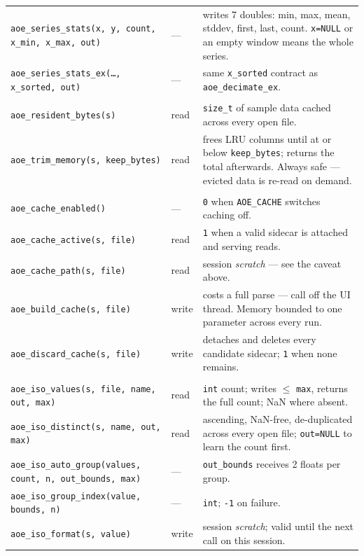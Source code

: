 \documentclass[11pt,a4paper,oneside]{report}
\newcommand{\code}[1]{\texttt{#1}}
\begin{document}
\begin{longtable}{@{}p{}p{}p{}@{}}
\code{aoe\_series\_stats(x, y, count, x\_min, x\_max, out)} & --- & writes 7 doubles: min, max, mean, stddev, first, last, count. \code{x=NULL} or an empty window means the whole series. \\
\code{aoe\_series\_stats\_ex(\ldots, x\_sorted, out)} & --- & same \code{x\_sorted} contract as \code{aoe\_decimate\_ex}. \\
\addlinespace
\multicolumn{3}{@{}l@{}}{\textit{Memory}} \\
\code{aoe\_resident\_bytes(s)} & read & \code{size\_t} of sample data cached across every open file. \\
\code{aoe\_trim\_memory(s, keep\_bytes)} & read & frees LRU columns until at or below \code{keep\_bytes}; returns the total afterwards. Always safe --- evicted data is re-read on demand. \\
\addlinespace
\multicolumn{3}{@{}l@{}}{\textit{Sidecar}} \\
\code{aoe\_cache\_enabled()} & --- & \code{0} when \code{AOE\_CACHE} switches caching off. \\
\code{aoe\_cache\_active(s, file)} & read & \code{1} when a valid sidecar is attached and serving reads. \\
\code{aoe\_cache\_path(s, file)} & read & session \emph{scratch} --- see the caveat above. \\
\code{aoe\_build\_cache(s, file)} & write & costs a full parse --- call off the UI thread. Memory bounded to one parameter across every run. \\
\code{aoe\_discard\_cache(s, file)} & write & detaches and deletes every candidate sidecar; \code{1} when none remains. \\
\addlinespace
\multicolumn{3}{@{}l@{}}{\textit{ISO}} \\
\code{aoe\_iso\_values(s, file, name, out, max)} & read & \code{int} count; writes $\le$ \code{max}, returns the full count; NaN where absent. \\
\code{aoe\_iso\_distinct(s, name, out, max)} & read & ascending, NaN-free, de-duplicated across every open file; \code{out=NULL} to learn the count first. \\
\code{aoe\_iso\_auto\_group(values, count, n, out\_bounds, max)} & --- & \code{out\_bounds} receives 2 floats per group. \\
\code{aoe\_iso\_group\_index(value, bounds, n)} & --- & \code{int}; \code{-1} on failure. \\
\code{aoe\_iso\_format(s, value)} & write & session \emph{scratch}; valid until the next call on this session. \\
\bottomrule
\end{longtable}
\endgroup
\end{document}
